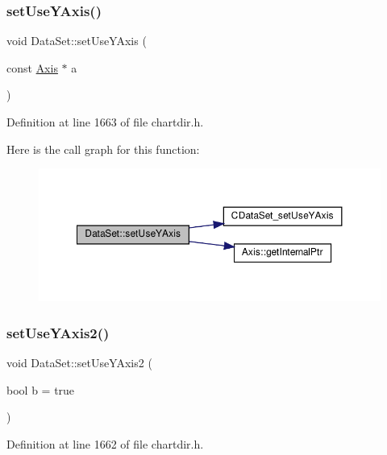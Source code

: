 \subsubsection{\texorpdfstring{set\+Use\+Y\+Axis()}{setUseYAxis()}}
{\footnotesize\ttfamily void Data\+Set\+::set\+Use\+Y\+Axis (\begin{DoxyParamCaption}\item[{const \hyperlink{class_axis}{Axis} $\ast$}]{a }\end{DoxyParamCaption})\hspace{0.3cm}{\ttfamily [inline]}}



Definition at line 1663 of file chartdir.\+h.

Here is the call graph for this function\+:
\nopagebreak
\begin{figure}[H]
\begin{center}
\leavevmode
\includegraphics[width=350pt]{class_data_set_a513df1915a715e378637ac4171c53a58_cgraph}
\end{center}
\end{figure}
\mbox{\label{class_data_set_a012ae8bc45533d67340c82a82b2f7f92}} 
\subsubsection{\texorpdfstring{set\+Use\+Y\+Axis2()}{setUseYAxis2()}}
{\footnotesize\ttfamily void Data\+Set\+::set\+Use\+Y\+Axis2 (\begin{DoxyParamCaption}\item[{bool}]{b = {\ttfamily true} }\end{DoxyParamCaption})\hspace{0.3cm}{\ttfamily [inline]}}



Definition at line 1662 of file chartdir.\+h.

